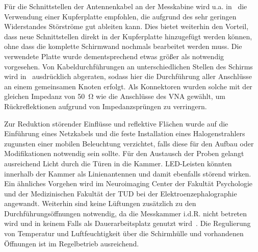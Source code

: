 Für die Schnittstellen der Antennenkabel an der Messkabine wird u.a. in~\cite{EM_Schirmung, EMV} die Verwendung einer Kupferplatte empfohlen, die aufgrund des sehr geringen Widerstandes Störströme gut ableiten kann. Dies bietet weiterhin den Vorteil, dass neue Schnittstellen direkt in der Kupferplatte hinzugefügt werden \mbox{können}, ohne dass die komplette Schirmwand nochmals bearbeitet werden muss. Die verwendete Platte wurde dementsprechend etwas größer als notwendig vorgesehen. Von Kabeldurchführungen an unterschiedlichen Stellen des Schirms wird in~\cite{EM_Schirmung, EMV, Design_of_shielded_enclosures} ausdrücklich abgeraten, sodass hier die Durchführung aller Anschlüsse an einem gemeinsamen Knoten erfolgt. Als Konnektoren wurden solche mit der gleichen Impedanz von \SI{50}{\ohm} wie die Anschlüsse des \ac{VNA} gewählt, um Rückreflektionen aufgrund von Impedanzsprüngen zu verringern. 
\par
\vspace{\linespace}
Zur Reduktion störender Einflüsse und reflektive Flächen wurde auf die Einführung eines Netzkabels und die feste Installation eines Halogenstrahlers zugunsten einer mobilen Beleuchtung verzichtet, falls diese für den Aufbau oder Modifikationen notwendig sein sollte. Für den Austausch der Proben gelangt ausreichend Licht durch die Türen in die Kammer. LED-Leisten könnten innerhalb der Kammer als Linienantennen und damit ebenfalls störend wirken. Ein ähnliches Vorgehen wird im Neuroimaging Center der Fakultät Psychologie und der Medizinischen Fakultät der TUD bei der Elektro\-enzephalo\-graphie angewandt. Weiterhin sind keine Lüftungen zusätzlich zu den Durchführungsöffnungen notwendig, da die Messkammer i.d.R. nicht betreten wird und in keinem Falls als Dauerarbeitsplatz genutzt wird~\cite{EM_Schirmung}. Die Regulierung von Temperatur und Luftfeuchtigkeit über die Schirmhülle und vorhandenen Öffnungen ist im Regelbetrieb ausreichend.  

    
\par
\vspace{\linespace}

